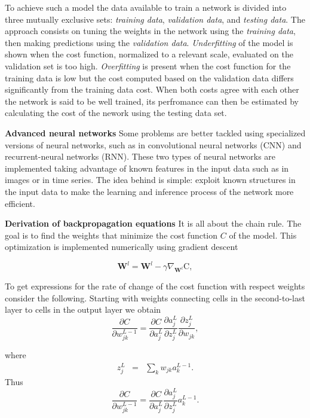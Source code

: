 \documentclass[11pt,onecolumn]{article}
\begin{document}
To achieve such a model the data available to train a network is divided into three mutually exclusive sets: 
\emph{training data}, \emph{validation data}, and \emph{testing data}. 
The approach consists on tuning the weights in the 
network using the \emph{training data}, then making predictions using the \emph{validation data}. 
\emph{Underfitting} of the model is shown when the cost function, normalized to a relevant scale,  evaluated on the validation set 
is too high. 
\emph{Overfitting} is present when the cost function for the training data is low but the cost computed based on 
the validation data differs significantly from the training data cost. 
When both costs agree with each other the network is said to be well trained, its perfromance can then be 
estimated by calculating the cost of the nework using the testing data set. 

\textbf{Advanced neural networks}
Some problems are better tackled using specialized versions of neural networks, such as in convolutional 
neural networks (CNN) and recurrent-neural networks (RNN). These two types of neural networks are 
implemented taking advantage of known features in the input data such as in images or in time series. 
The idea behind is simple: exploit known structures in the input data to make the learning and inference 
process of the network more efficient.

\textbf{Derivation of backpropagation equations} It is all about the chain rule. The goal is to find
the weights that minimize the cost function $C$ of the model. This optimization is implemented numerically 
using gradient descent 

\begin{equation}
	\mathbf{W}^{l} = \mathbf{W}^{l} - \gamma \nabla_{\mathbf{W}^{l}} \mathrm{C},
\end{equation}

To get expressions for the rate of change of the cost function with respect weights consider the following.
Starting with weights connecting cells in the second-to-last layer to cells in the output layer we obtain 
\begin{equation}
    \frac{\partial C}{\partial w^{L-1}_{jk}} =  \frac{\partial C}{\partial a^{L}_j} 
                                               \frac{\partial a^{L}_j}{\partial z^{L}_j}
                                               \frac{\partial z^{L}_j}{\partial w_{jk} },
\end{equation}

where 
\begin{eqnarray}
    z^{L}_j &=& \sum_k w_{jk} a^{L-1}_k. 
\end{eqnarray}  
Thus 
\begin{equation}
    \frac{\partial C}{\partial w^{L-1}_{jk}} =  \frac{\partial C}{\partial a^{L}_j} 
                                               \frac{\partial a^{L}_j}{\partial z^{L}_j}
                                               a^{L-1}_k.
\end{equation}
\end{document}
